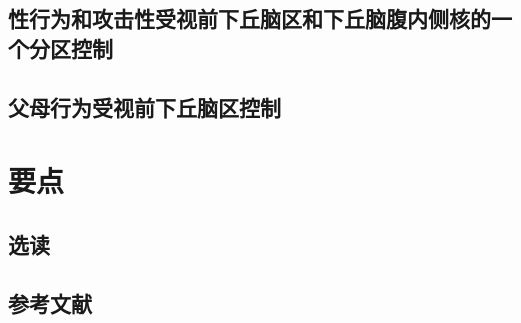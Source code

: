\subsection{性行为和攻击性受视前下丘脑区和下丘脑腹内侧核的一个分区控制}
\subsection{父母行为受视前下丘脑区控制}

\section{要点}
\subsection{选读}
\subsection{参考文献}